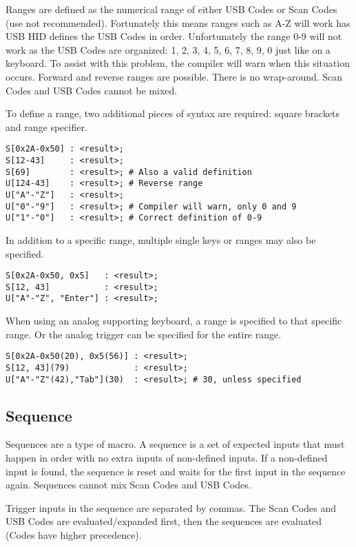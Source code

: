 \documentclass{kiibohd-template}
\begin{document}
Ranges are defined as the numerical range of either USB Codes or Scan Codes (use not recommended).
Fortunately this means ranges such as A-Z will work has USB HID defines the USB Codes in order.
Unfortunately the range 0-9 will not work as the USB Codes are organized: 1, 2, 3, 4, 5, 6, 7, 8, 9, 0 just like on a keyboard.
To assist with this problem, the compiler will warn when this situation occurs.
Forward and reverse ranges are possible.
There is no wrap-around.
Scan Codes and USB Codes cannot be mixed.

To define a range, two additional pieces of syntax are required: square brackets and range specifier.

\begin{lstlisting}
S[0x2A-0x50] : <result>;
S[12-43]     : <result>;
S[69]        : <result>; # Also a valid definition
U[124-43]    : <result>; # Reverse range
U["A"-"Z"]   : <result>;
U["0"-"9"]   : <result>; # Compiler will warn, only 0 and 9
U["1"-"0"]   : <result>; # Correct definition of 0-9
\end{lstlisting}

In addition to a specific range, multiple single keys or ranges may also be specified.

\begin{lstlisting}
S[0x2A-0x50, 0x5]   : <result>;
S[12, 43]           : <result>;
U["A"-"Z", "Enter"] : <result>;
\end{lstlisting}

When using an analog supporting keyboard, a range is specified to that specific range.
Or the analog trigger can be specified for the entire range.

\begin{lstlisting}
S[0x2A-0x50(20), 0x5(56)] : <result>;
S[12, 43](79)             : <result>;
U["A"-"Z"(42),"Tab"](30)  : <result>; # 30, unless specified
\end{lstlisting}


\subsection{Sequence}
\label{subsec:Sequence}

Sequences are a type of macro.
A sequence is a set of expected inputs that must happen in order with no extra inputs of non-defined inputs.
If a non-defined input is found, the sequence is reset and waits for the first input in the sequence again.
Sequences cannot mix Scan Codes and USB Codes.

Trigger inputs in the sequence are separated by commas.
The Scan Codes and USB Codes are evaluated/expanded first, then the sequences are evaluated (Codes have higher precedence).
\end{document}
